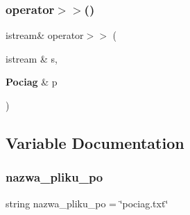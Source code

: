 \mbox{\label{pociag_8cpp_a00926731077d7f0d7c1a81c50bee727d}} 
\subsubsection{operator$>$$>$()}
{\footnotesize\ttfamily istream\& operator$>$$>$ (\begin{DoxyParamCaption}\item[{istream \&}]{s,  }\item[{\textbf{ Pociag} \&}]{p }\end{DoxyParamCaption})}



\subsection{Variable Documentation}
\mbox{\label{pociag_8cpp_a5311644a6939f63f9bd0b8c1a7e3809b}} 
\subsubsection{nazwa\+\_\+pliku\+\_\+po}
{\footnotesize\ttfamily string nazwa\+\_\+pliku\+\_\+po = \char`\"{}pociag.\+txt\char`\"{}}

